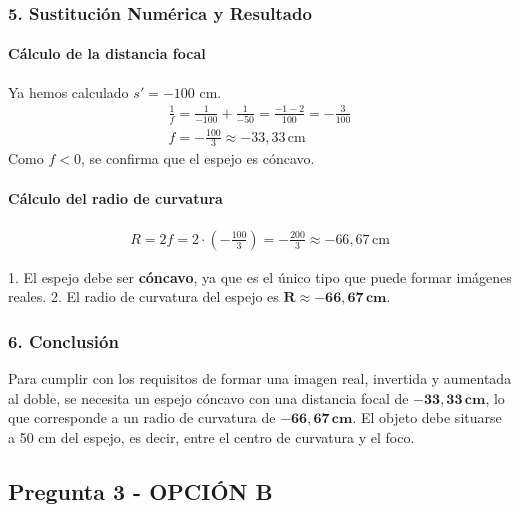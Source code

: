 \subsubsection*{5. Sustitución Numérica y Resultado}
\paragraph*{Cálculo de la distancia focal}
Ya hemos calculado $s' = -100$ cm.
\begin{gather}
    \frac{1}{f} = \frac{1}{-100} + \frac{1}{-50} = \frac{-1 - 2}{100} = -\frac{3}{100} \\
    f = -\frac{100}{3} \approx -33,33 \, \text{cm}
\end{gather}
Como $f < 0$, se confirma que el espejo es cóncavo.

\paragraph*{Cálculo del radio de curvatura}
\begin{gather}
    R = 2f = 2 \cdot \left(-\frac{100}{3}\right) = -\frac{200}{3} \approx -66,67 \, \text{cm}
\end{gather}
\begin{cajaresultado}
    1. El espejo debe ser \textbf{cóncavo}, ya que es el único tipo que puede formar imágenes reales.
    2. El radio de curvatura del espejo es $\boldsymbol{R \approx -66,67 \, \textbf{cm}}$.
\end{cajaresultado}

\subsubsection*{6. Conclusión}
\begin{cajaconclusion}
Para cumplir con los requisitos de formar una imagen real, invertida y aumentada al doble, se necesita un espejo cóncavo con una distancia focal de $\mathbf{-33,33 \, cm}$, lo que corresponde a un radio de curvatura de $\mathbf{-66,67 \, cm}$. El objeto debe situarse a 50 cm del espejo, es decir, entre el centro de curvatura y el foco.
\end{cajaconclusion}

\newpage

\subsection{Pregunta 3 - OPCIÓN B}
\label{subsec:3B_2002_sep_ext}

